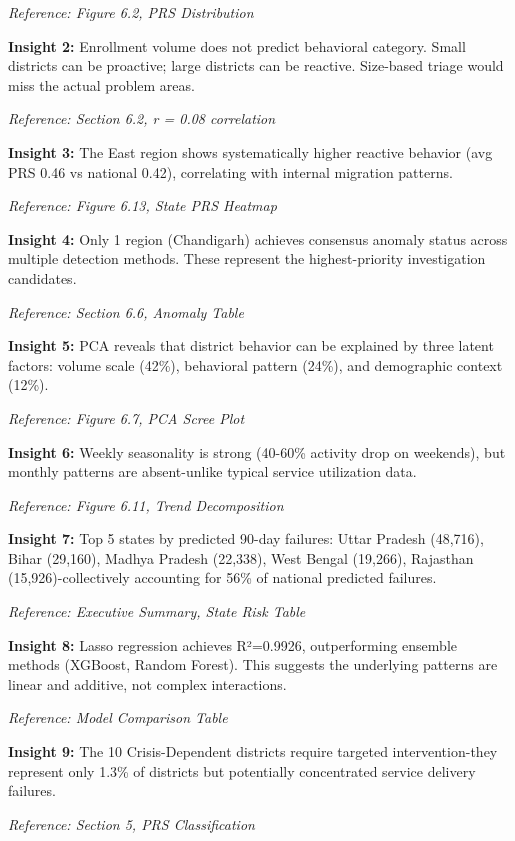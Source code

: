 \documentclass[11pt, a4paper]{article}
\begin{document}
\textit{Reference: Figure 6.2, PRS Distribution}


\textbf{Insight 2:} Enrollment volume does not predict behavioral category. Small districts can be proactive; large districts can be reactive. Size-based triage would miss the actual problem areas.

\textit{Reference: Section 6.2, r = 0.08 correlation}


\textbf{Insight 3:} The East region shows systematically higher reactive behavior (avg PRS 0.46 vs national 0.42), correlating with internal migration patterns.

\textit{Reference: Figure 6.13, State PRS Heatmap}


\textbf{Insight 4:} Only 1 region (Chandigarh) achieves consensus anomaly status across multiple detection methods. These represent the highest-priority investigation candidates.

\textit{Reference: Section 6.6, Anomaly Table}


\textbf{Insight 5:} PCA reveals that district behavior can be explained by three latent factors: volume scale (42\%), behavioral pattern (24\%), and demographic context (12\%).

\textit{Reference: Figure 6.7, PCA Scree Plot}


\textbf{Insight 6:} Weekly seasonality is strong (40-60\% activity drop on weekends), but monthly patterns are absent-unlike typical service utilization data.

\textit{Reference: Figure 6.11, Trend Decomposition}


\textbf{Insight 7:} Top 5 states by predicted 90-day failures: Uttar Pradesh (48,716), Bihar (29,160), Madhya Pradesh (22,338), West Bengal (19,266), Rajasthan (15,926)-collectively accounting for 56\% of national predicted failures.

\textit{Reference: Executive Summary, State Risk Table}


\textbf{Insight 8:} Lasso regression achieves R²=0.9926, outperforming ensemble methods (XGBoost, Random Forest). This suggests the underlying patterns are linear and additive, not complex interactions.

\textit{Reference: Model Comparison Table}


\textbf{Insight 9:} The 10 Crisis-Dependent districts require targeted intervention-they represent only 1.3\% of districts but potentially concentrated service delivery failures.

\textit{Reference: Section 5, PRS Classification}
\end{document}
